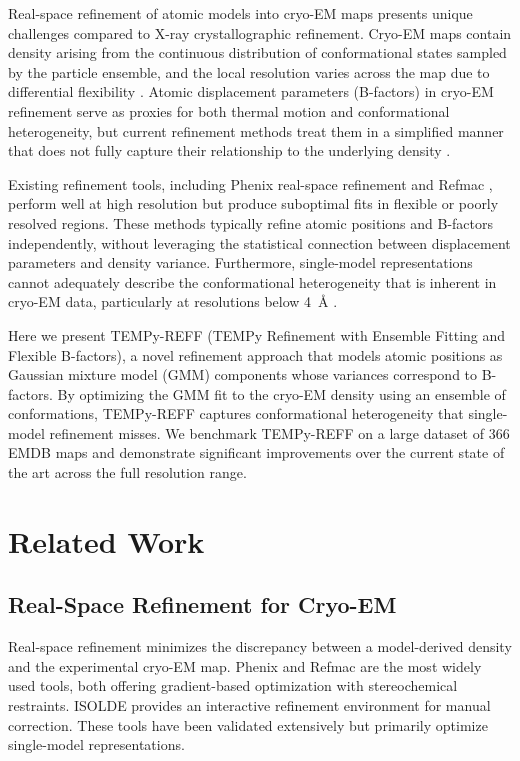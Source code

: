 \documentclass[11pt]{article}
\begin{document}
Real-space refinement of atomic models into cryo-EM maps presents unique challenges compared to X-ray crystallographic refinement. Cryo-EM maps contain density arising from the continuous distribution of conformational states sampled by the particle ensemble, and the local resolution varies across the map due to differential flexibility \citep{cardone2013,kucukelbir2014}. Atomic displacement parameters (B-factors) in cryo-EM refinement serve as proxies for both thermal motion and conformational heterogeneity, but current refinement methods treat them in a simplified manner that does not fully capture their relationship to the underlying density \citep{murshudov2011,afonine2018}.

Existing refinement tools, including Phenix real-space refinement \citep{afonine2018} and Refmac \citep{murshudov2011,nicholls2018}, perform well at high resolution but produce suboptimal fits in flexible or poorly resolved regions. These methods typically refine atomic positions and B-factors independently, without leveraging the statistical connection between displacement parameters and density variance. Furthermore, single-model representations cannot adequately describe the conformational heterogeneity that is inherent in cryo-EM data, particularly at resolutions below 4~\AA{} \citep{bonomi2019}.

Here we present TEMPy-REFF (TEMPy Refinement with Ensemble Fitting and Flexible B-factors), a novel refinement approach that models atomic positions as Gaussian mixture model (GMM) components whose variances correspond to B-factors. By optimizing the GMM fit to the cryo-EM density using an ensemble of conformations, TEMPy-REFF captures conformational heterogeneity that single-model refinement misses. We benchmark TEMPy-REFF on a large dataset of 366 EMDB maps and demonstrate significant improvements over the current state of the art across the full resolution range.

\section{Related Work}

\subsection{Real-Space Refinement for Cryo-EM}

Real-space refinement minimizes the discrepancy between a model-derived density and the experimental cryo-EM map. Phenix \citep{afonine2018} and Refmac \citep{murshudov2011,nicholls2018} are the most widely used tools, both offering gradient-based optimization with stereochemical restraints. ISOLDE \citep{croll2018} provides an interactive refinement environment for manual correction. These tools have been validated extensively but primarily optimize single-model representations.
\end{document}
